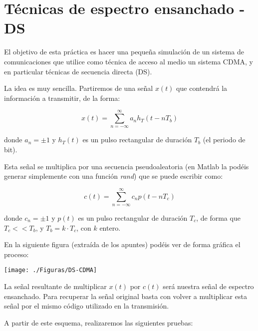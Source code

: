 \documentclass[es,practica]{uah}
\begin{document}

\maketitle

\section{Técnicas de espectro ensanchado - DS}

El objetivo de esta práctica es hacer una pequeña simulación de un sistema de comunicaciones que utilice como técnica de acceso al medio un sistema CDMA, y en particular técnicas de secuencia directa (DS). 

La idea es muy sencilla. Partiremos de una señal $x(t)$ que contendrá la información a transmitir, de la forma:

\begin{equation}
	x(t) = \sum_{n=-\infty}^{\infty} a_n h_T(t - nT_b)
\end{equation}

donde $a_n = \pm 1$ y $h_T(t)$ es un pulso rectangular de duración $T_b$ (el periodo de bit).

Esta señal se multiplica por una secuencia pseudoaleatoria (en Matlab la podéis generar simplemente con una función \emph{rand}) que se puede escribir como:

\begin{equation}
	c(t) = \sum_{n=-\infty}^{\infty} c_n p(t - nT_c)
\end{equation}

donde $c_n=\pm 1$ y $p(t)$ es un pulso rectangular de duración $T_c$, de forma que $T_c << T_b$, y $T_b = k\cdot T_c$, con $k$ entero. 

En la siguiente figura (extraída de los apuntes) podéis ver de forma gráfica el proceso: 

\begin{figure*}[h!]
	\centering\texttt{[image: ./Figuras/DS-CDMA]}
\end{figure*}


La señal resultante de multiplicar $x(t)$ por $c(t)$ será nuestra señal de espectro ensanchado. Para recuperar la señal original basta con volver a multiplicar esta señal por el mismo código utilizado en la transmisión. 

A partir de este esquema, realizaremos las siguientes pruebas:
\end{document}
